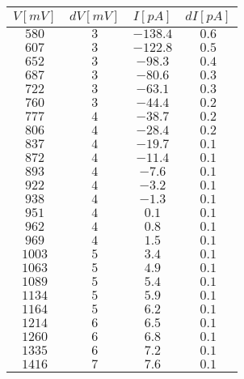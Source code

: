 \begin{tabular}{cccc}
\hline
	$V[mV]$ & $dV[mV]$ & $I[pA]$ & $dI[pA]$\\ 
\hline
	$580$ & $3$ & $-138.4$ & $0.6$ \\
	$607$ & $3$ & $-122.8$ & $0.5$ \\
	$652$ & $3$ & $-98.3$ & $0.4$ \\
	$687$ & $3$ & $-80.6$ & $0.3$ \\
	$722$ & $3$ & $-63.1$ & $0.3$ \\
	$760$ & $3$ & $-44.4$ & $0.2$ \\
	$777$ & $4$ & $-38.7$ & $0.2$ \\
	$806$ & $4$ & $-28.4$ & $0.2$ \\
	$837$ & $4$ & $-19.7$ & $0.1$ \\
	$872$ & $4$ & $-11.4$ & $0.1$ \\
	$893$ & $4$ & $-7.6$ & $0.1$ \\
	$922$ & $4$ & $-3.2$ & $0.1$ \\
	$938$ & $4$ & $-1.3$ & $0.1$ \\
	$951$ & $4$ & $0.1$ & $0.1$ \\
	$962$ & $4$ & $0.8$ & $0.1$ \\
	$969$ & $4$ & $1.5$ & $0.1$ \\
	$1003$ & $5$ & $3.4$ & $0.1$ \\
	$1063$ & $5$ & $4.9$ & $0.1$ \\
	$1089$ & $5$ & $5.4$ & $0.1$ \\
	$1134$ & $5$ & $5.9$ & $0.1$ \\
	$1164$ & $5$ & $6.2$ & $0.1$ \\
	$1214$ & $6$ & $6.5$ & $0.1$ \\
	$1260$ & $6$ & $6.8$ & $0.1$ \\
	$1335$ & $6$ & $7.2$ & $0.1$ \\
	$1416$ & $7$ & $7.6$ & $0.1$ \\
\hline
\end{tabular}
